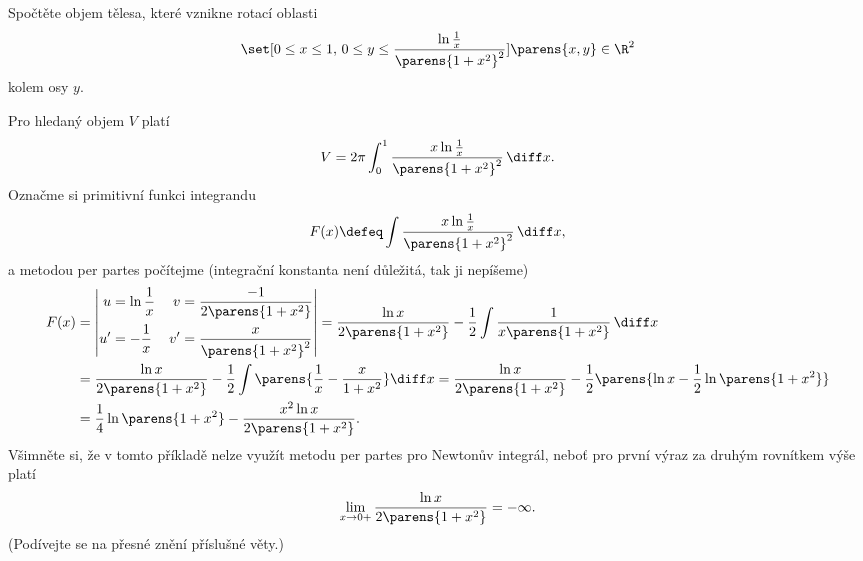 \documentclass[answers]{exam}
\begin{document}
\begin{questions}
\begin{solution}
  \end{solution}

  \question Spočtěte objem tělesa, které vznikne rotací oblasti 
  \begin{equation*}
  	\set[
  		0 \le x \le 1, \, 0 \le y \le \frac{\ln \frac{1}{x}}{\parens{1 + x^2}^2}
  	]{
  		\parens{x, y} \in \R^2
  	}
  \end{equation*}
  kolem osy $y$.
  
  \begin{solution}
  	Pro hledaný objem $V$ platí 
  	\begin{equation*}
  		V 
  		= 
  		2 \pi \int_{0}^{1} \frac{x \ln \frac{1}{x}}{\parens{1 + x^2}^2} \, \diff x.
  	\end{equation*}
  	Označme si primitivní funkci integrandu
  	\begin{equation*}
  		F(x)
  		\defeq
  		\int \frac{x \ln \frac{1}{x}}{\parens{1 + x^2}^2} \, \diff x,
  	\end{equation*}
  	a metodou per partes počítejme (integrační konstanta není důležitá, tak ji nepíšeme)
  	\begin{align*}
  		F(x)
  		&=
      \left| 
        \begin{aligned}
          u &= \ln \frac{1}{x} & v &= \frac{-1}{2\parens{1 + x^2}}
          \\
          u' &= -\frac{1}{x} & v' &= \frac{x}{\parens{1 + x^2}^2}
        \end{aligned}
      \right|
      =
      \frac{\ln x}{2 \parens{1 + x^2}}
      -
      \frac{1}{2} \int \frac{1}{x \parens{1 + x^2}} \, \diff x
      \\
      &=
      \frac{\ln x}{2 \parens{1 + x^2}}
      -
      \frac{1}{2}
      \int
      	\parens{\frac{1}{x} - \frac{x}{1 + x^2}}
      \diff x
      =
      \frac{\ln x}{2 \parens{1 + x^2}}
      -
      \frac{1}{2}
      \parens{\ln x - \frac{1}{2} \ln \parens{1 + x^2}}
      \\
      &=
      \frac{1}{4} \ln \parens{1 + x^2}
      -
      \frac{x^2 \ln x}{2 \parens{1 + x^2}}.
  	\end{align*}
  	Všimněte si, že v tomto příkladě nelze využít metodu per partes pro Newtonův integrál, neboť pro první výraz za druhým rovnítkem výše platí
  	\begin{equation*}
  		\lim_{x \to 0+} 
  		\frac{\ln x}{2 \parens{1 + x^2}} = -\infty.
  	\end{equation*}
  	(Podívejte se na přesné znění příslušné věty.)
  	

\end{solution}
\end{questions}
\end{document}

